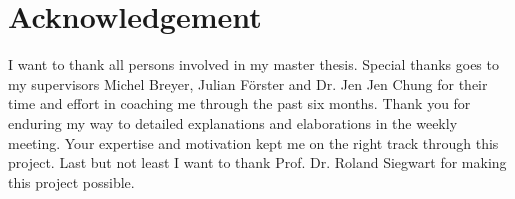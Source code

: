 \chapter*{Acknowledgement}

I want to thank all persons involved in my master thesis. Special thanks goes to my supervisors 	
Michel Breyer, Julian Förster and  Dr. Jen Jen Chung for their time and effort in coaching me through the past six months. Thank you for enduring my way to detailed explanations and elaborations in the weekly meeting. Your expertise and motivation kept me on the right track through this project. Last but not least I want to thank Prof. Dr. Roland Siegwart for making this project possible. 